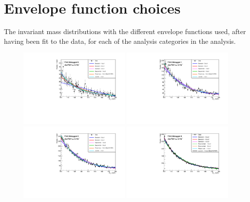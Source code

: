 
\chapter{Envelope function choices}
\label{sec:app_env}

The invariant mass distributions with the different envelope functions used, after having been fit to the data, for each of the analysis categories in the \MFM analysis.

\begin{figure}
  \includegraphics[width=0.49\textwidth]{analysis/plots/multipdf_plots/cat0_7TeV.pdf}
  \includegraphics[width=0.49\textwidth]{analysis/plots/multipdf_plots/cat1_7TeV.pdf}\\
  \includegraphics[width=0.49\textwidth]{analysis/plots/multipdf_plots/cat2_7TeV.pdf}
  \includegraphics[width=0.49\textwidth]{analysis/plots/multipdf_plots/cat3_7TeV.pdf}\\

\end{figure}

